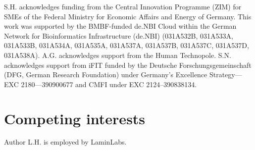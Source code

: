 \documentclass{bioinfo}
\theoremstyle{definition}
\begin{document}
	 S.H. acknowledges funding from the Central Innovation Programme (ZIM) for SMEs of the Federal Ministry for Economic Affairs and Energy of Germany. This work was supported by the BMBF-funded de.NBI Cloud within the German Network for Bioinformatics Infrastructure (de.NBI) (031A532B, 031A533A, 031A533B, 031A534A, 031A535A, 031A537A, 031A537B, 031A537C, 031A537D, 031A538A). A.G. acknowledges support from the Human Technopole. S.N. acknowledges support from iFIT funded by the Deutsche Forschungsgemeinschaft (DFG, German Research Foundation) under Germany’s Excellence Strategy—EXC 2180—390900677 and CMFI under EXC 2124–390838134.
	 
	\vspace{-0.6cm}
	
	\section*{Competing interests}
	Author L.H. is employed by LaminLabs.
	
	\vspace{-0.6cm}
	
%	
		
	
	
\end{document}
